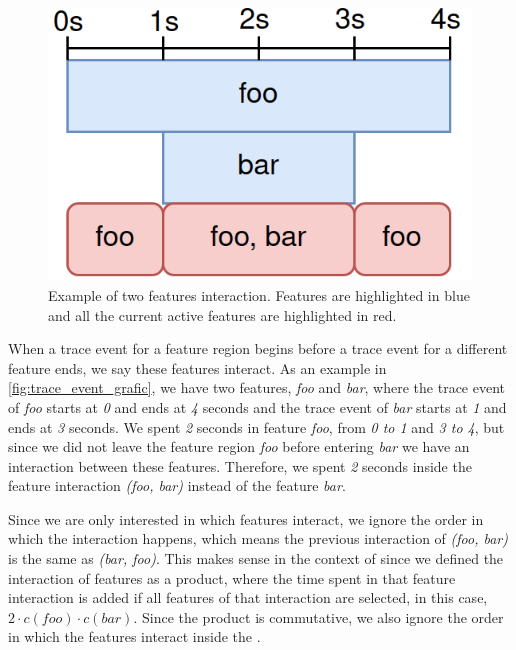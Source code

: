 \begin{figure}[h]
    \centering
    \includegraphics[scale=0.25]{gfx/trace_event_grafic.png}
    \caption{Example of two features interaction. Features are highlighted in blue and all the current active features are highlighted in red.}
    \label{fig:trace_event_grafic}
\end{figure}

When a trace event for a feature region begins before a trace event for a different feature ends, we say these features interact. 
As an example in \autoref{fig:trace_event_grafic}, we have two features, \emph{foo} and \emph{bar}, where the trace event of \emph{foo} starts at \emph{0} and ends at \emph{4} seconds 
and the trace event of \emph{bar} starts at \emph{1} and ends at \emph{3} seconds. We spent \emph{2} seconds in feature \emph{foo}, 
from \emph{0 to 1} and \emph{3 to 4}, 
but since we did not leave the feature region \emph{foo} before entering \emph{bar} we have an interaction between these features. 
Therefore, we spent \emph{2} seconds inside the feature interaction \emph{(foo, bar)} instead of the feature \emph{bar}.

Since we are only interested in which features interact, we ignore the order in which the interaction happens, which means the previous
interaction of \emph{(foo, bar)} is the same as \emph{(bar, foo)}. This makes sense in the context of {\perfInfluenceModel} since we defined
the interaction of features as a product, where the time spent in that feature interaction is added if all features of that interaction are selected,
in this case, $2 \cdot c(foo) \cdot c(bar)$. Since the product is commutative, we also ignore the order in which the features interact inside the \perfInfluenceModel.

